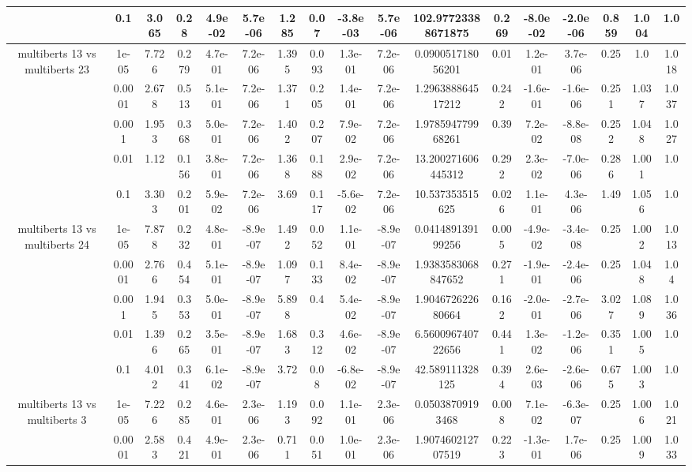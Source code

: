 \begin{tabular}{|c|c|c|c|c|c|c|c|c|c|c|c|c|c|c|c|c|}
 & 0.1 & 3.065 & 0.28 & 4.9e-02 & 5.7e-06 & 1.285 & 0.07 & -3.8e-03 & 5.7e-06 & 102.97723388671875 & 0.269 & -8.0e-02 & -2.0e-06 & 0.859 & 1.004 & 1.0 \\
\hline
\multirow{5}{*}{multiberts 13 vs multiberts 23} & 1e-05 & 7.726 & 0.279 & 4.7e-01 & 7.2e-06 & 1.395 & 0.093 & 1.3e-01 & 7.2e-06 & 0.090051718056201 & 0.01 & 1.2e-01 & 3.7e-06 & 0.25 & 1.0 & 1.018 \\
 & 0.0001 & 2.678 & 0.513 & 5.1e-01 & 7.2e-06 & 1.371 & 0.205 & 1.4e-01 & 7.2e-06 & 1.296388864517212 & 0.242 & -1.6e-01 & -1.6e-06 & 0.251 & 1.037 & 1.037 \\
 & 0.001 & 1.953 & 0.368 & 5.0e-01 & 7.2e-06 & 1.402 & 0.207 & 7.9e-02 & 7.2e-06 & 1.978594779968261 & 0.39 & 7.2e-02 & -8.8e-08 & 0.252 & 1.048 & 1.027 \\
 & 0.01 & 1.12 & 0.156 & 3.8e-01 & 7.2e-06 & 1.368 & 0.188 & 2.9e-02 & 7.2e-06 & 13.200271606445312 & 0.292 & 2.3e-02 & -7.0e-06 & 0.286 & 1.001 & 1.0 \\
 & 0.1 & 3.303 & 0.201 & 5.9e-02 & 7.2e-06 & 3.69 & 0.117 & -5.6e-02 & 7.2e-06 & 10.537353515625 & 0.026 & 1.1e-01 & 4.3e-06 & 1.49 & 1.056 & 1.0 \\
\hline
\multirow{5}{*}{multiberts 13 vs multiberts 24} & 1e-05 & 7.878 & 0.232 & 4.8e-01 & -8.9e-07 & 1.492 & 0.052 & 1.1e-01 & -8.9e-07 & 0.041489139199256 & 0.005 & -4.9e-02 & -3.4e-08 & 0.25 & 1.002 & 1.013 \\
 & 0.0001 & 2.766 & 0.454 & 5.1e-01 & -8.9e-07 & 1.097 & 0.133 & 8.4e-02 & -8.9e-07 & 1.9383583068847652 & 0.271 & -1.9e-01 & -2.4e-06 & 0.25 & 1.048 & 1.04 \\
 & 0.001 & 1.945 & 0.353 & 5.0e-01 & -8.9e-07 & 5.898 & 0.4 & 5.4e-02 & -8.9e-07 & 1.904672622680664 & 0.162 & -2.0e-01 & -2.7e-06 & 3.027 & 1.089 & 1.036 \\
 & 0.01 & 1.396 & 0.265 & 3.5e-01 & -8.9e-07 & 1.683 & 0.312 & 4.6e-02 & -8.9e-07 & 6.560096740722656 & 0.441 & 1.3e-02 & -1.2e-06 & 0.351 & 1.005 & 1.0 \\
 & 0.1 & 4.012 & 0.341 & 6.1e-02 & -8.9e-07 & 3.72 & 0.08 & -6.8e-02 & -8.9e-07 & 42.589111328125 & 0.394 & 2.6e-03 & -2.6e-06 & 0.675 & 1.003 & 1.0 \\
\hline
\multirow{5}{*}{multiberts 13 vs multiberts 3} & 1e-05 & 7.226 & 0.285 & 4.6e-01 & 2.3e-06 & 1.193 & 0.092 & 1.1e-01 & 2.3e-06 & 0.05038709193468 & 0.008 & 7.1e-02 & -6.3e-07 & 0.25 & 1.006 & 1.021 \\
 & 0.0001 & 2.583 & 0.421 & 4.9e-01 & 2.3e-06 & 0.711 & 0.051 & 1.0e-01 & 2.3e-06 & 1.907460212707519 & 0.223 & -1.3e-01 & 1.7e-06 & 0.25 & 1.009 & 1.033 \\

\end{tabular}
